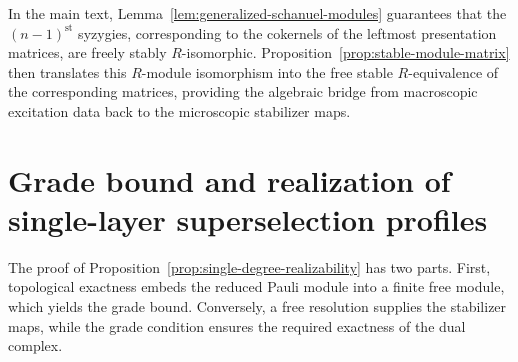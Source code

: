 \documentclass[aps,prx,english,superscriptaddress,twocolumn,tightenlines,showpacs,longbibliography,floatfix,amsfonts]{revtex4-2}
\theoremstyle{remark}
\theoremstyle{definition}
\begin{document}
In the main text, Lemma~\ref{lem:generalized-schanuel-modules} guarantees that
the $(n-1)^{\text{st}}$ syzygies, corresponding to the cokernels of the leftmost presentation
matrices, are freely stably \(R\)-isomorphic. Proposition~\ref{prop:stable-module-matrix}
then translates this \(R\)-module isomorphism into the free stable \(R\)-equivalence of the
corresponding matrices, providing the algebraic bridge from macroscopic
excitation data back to the microscopic stabilizer maps.

\section{Grade bound and realization of single-layer superselection profiles}
\label{app:profile-realization}

The proof of Proposition~\ref{prop:single-degree-realizability} has two parts. First, topological exactness embeds the reduced
Pauli module into a finite free module, which yields the grade bound.
Conversely, a free resolution supplies the stabilizer maps, while the grade
condition ensures the required exactness of the dual complex.
\end{document}
